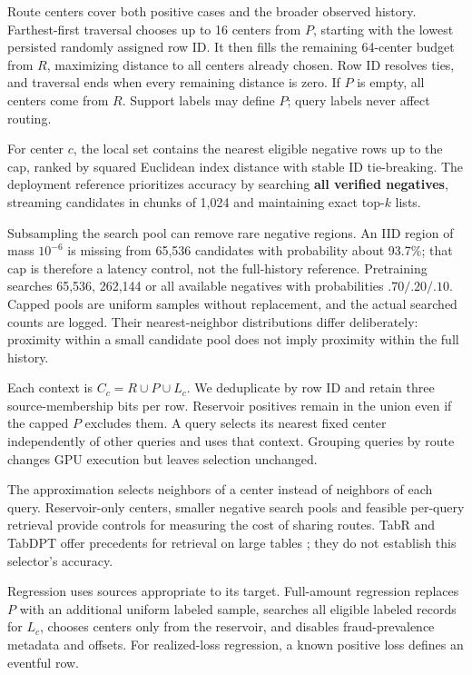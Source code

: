 \documentclass[11pt]{article}
\begin{document}
Route centers cover both positive cases and the broader observed history. Farthest-first traversal chooses up to 16 centers from $P$, starting with the lowest persisted randomly assigned row ID. It then fills the remaining 64-center budget from $R$, maximizing distance to all centers already chosen. Row ID resolves ties, and traversal ends when every remaining distance is zero. If $P$ is empty, all centers come from $R$. Support labels may define $P$; query labels never affect routing.

For center $c$, the local set contains the nearest eligible negative rows up to the cap, ranked by squared Euclidean index distance with stable ID tie-breaking. The deployment reference prioritizes accuracy by searching \textbf{all verified negatives}, streaming candidates in chunks of 1,024 and maintaining exact top-$k$ lists.

Subsampling the search pool can remove rare negative regions. An IID region of mass $10^{-6}$ is missing from 65,536 candidates with probability about 93.7\%; that cap is therefore a latency control, not the full-history reference. Pretraining searches 65,536, 262,144 or all available negatives with probabilities $.70/.20/.10$. Capped pools are uniform samples without replacement, and the actual searched counts are logged. Their nearest-neighbor distributions differ deliberately: proximity within a small candidate pool does not imply proximity within the full history.

Each context is $C_c=R\cup P\cup L_c$. We deduplicate by row ID and retain three source-membership bits per row. Reservoir positives remain in the union even if the capped $P$ excludes them. A query selects its nearest fixed center independently of other queries and uses that context. Grouping queries by route changes GPU execution but leaves selection unchanged.

The approximation selects neighbors of a center instead of neighbors of each query. Reservoir-only centers, smaller negative search pools and feasible per-query retrieval provide controls for measuring the cost of sharing routes. TabR and TabDPT offer precedents for retrieval on large tables \cite{tabr,tabdpt}; they do not establish this selector's accuracy.

Regression uses sources appropriate to its target. Full-amount regression replaces $P$ with an additional uniform labeled sample, searches all eligible labeled records for $L_c$, chooses centers only from the reservoir, and disables fraud-prevalence metadata and offsets. For realized-loss regression, a known positive loss defines an eventful row.
\end{document}
